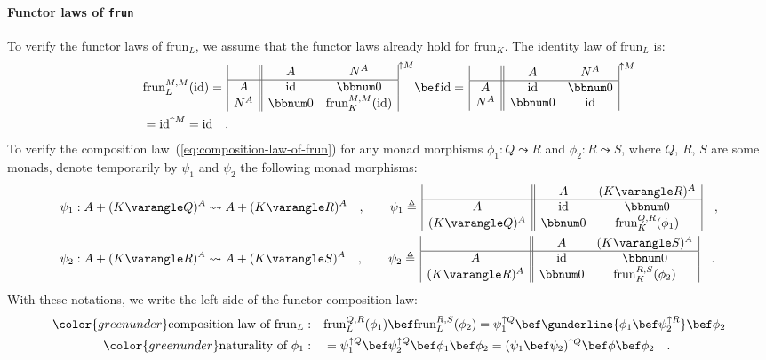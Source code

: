 \paragraph{Functor laws of \texttt{frun}}

To verify the functor laws of $\text{frun}_{L}$, we assume that the
functor laws already hold for $\text{frun}_{K}$. The identity law
of $\text{frun}_{L}$ is:
\begin{align*}
 & \text{frun}_{L}^{M,M}(\text{id})=\,\begin{array}{|c||cc|}
 & A & N^{A}\\
\hline A & \text{id} & \bbnum 0\\
N^{A} & \bbnum 0 & \text{frun}_{K}^{M,M}(\text{id})
\end{array}^{\uparrow M}\bef\text{id}=\,\begin{array}{|c||cc|}
 & A & N^{A}\\
\hline A & \text{id} & \bbnum 0\\
N^{A} & \bbnum 0 & \text{id}
\end{array}^{\uparrow M}\\
 & =\text{id}^{\uparrow M}=\text{id}\quad.
\end{align*}
To verify the composition law~(\ref{eq:composition-law-of-frun})
for any monad morphisms $\phi_{1}:Q\leadsto R$ and $\phi_{2}:R\leadsto S$,
where $Q$, $R$, $S$ are some monads, denote temporarily by $\psi_{1}$
and $\psi_{2}$ the following monad morphisms:
\begin{align*}
 & \psi_{1}:A+(K\varangle Q)^{A}\leadsto A+(K\varangle R)^{A}\quad,\quad\quad\psi_{1}\triangleq\,\begin{array}{|c||cc|}
 & A & (K\varangle R)^{A}\\
\hline A & \text{id} & \bbnum 0\\
(K\varangle Q)^{A} & \bbnum 0 & \text{frun}_{K}^{Q,R}(\phi_{1})
\end{array}\quad,\\
 & \psi_{2}:A+(K\varangle R)^{A}\leadsto A+(K\varangle S)^{A}\quad,\quad\quad\psi_{2}\triangleq\,\begin{array}{|c||cc|}
 & A & (K\varangle S)^{A}\\
\hline A & \text{id} & \bbnum 0\\
(K\varangle R)^{A} & \bbnum 0 & \text{frun}_{K}^{R,S}(\phi_{2})
\end{array}\quad.
\end{align*}
With these notations, we write the left side of the functor composition
law:
\begin{align*}
{\color{greenunder}\text{composition law of }\text{frun}_{L}:}\quad & \text{frun}_{L}^{Q,R}(\phi_{1})\bef\text{frun}_{L}^{R,S}(\phi_{2})=\psi_{1}^{\uparrow Q}\bef\gunderline{\phi_{1}\bef\psi_{2}^{\uparrow R}}\bef\phi_{2}\\
{\color{greenunder}\text{naturality of }\phi_{1}:}\quad & =\psi_{1}^{\uparrow Q}\bef\psi_{2}^{\uparrow Q}\bef\phi_{1}\bef\phi_{2}=(\psi_{1}\bef\psi_{2})^{\uparrow Q}\bef\phi\bef\phi_{2}\quad.
\end{align*}
